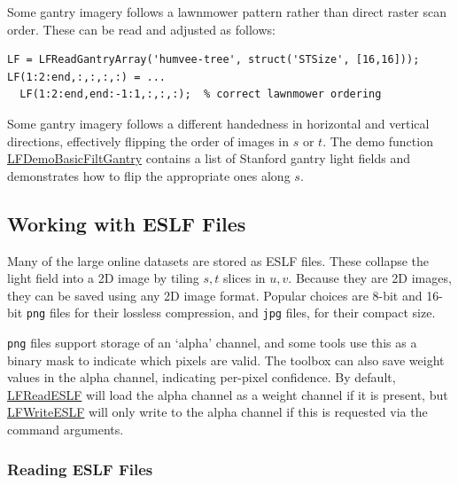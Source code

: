 \documentclass[onecolumn]{article}
\newcommand{\CiteFunc}[1]{\hyperlink{#1}{\small #1}}
\newcommand{\SymbolText}[1]{\texttt{\small #1}}
\begin{document}
Some gantry imagery follows a lawnmower pattern rather than direct raster scan order.  These can be read and adjusted as follows:
\begin{Verbatim}
LF = LFReadGantryArray('humvee-tree', struct('STSize', [16,16]));
LF(1:2:end,:,:,:,:) = ...
  LF(1:2:end,end:-1:1,:,:,:);  % correct lawnmower ordering
\end{Verbatim}

Some gantry imagery follows a different handedness in horizontal and vertical directions, effectively flipping the order of images in $s$ or $t$.  The demo function \CiteFunc{LFDemoBasicFiltGantry} contains a list of Stanford gantry light fields and demonstrates how to flip the appropriate ones along $s$.

\subsection{Working with ESLF Files}
\label{sect_ESLFTour}

Many of the large online datasets are stored as ESLF files. These collapse the light field into a 2D image by tiling $s,t$ slices in $u,v$. Because they are 2D images, they can be saved using any 2D image format. Popular choices are 8-bit and 16-bit \SymbolText{png} files for their lossless compression, and \SymbolText{jpg} files, for their compact size.  

\SymbolText{png} files support storage of an `alpha' channel, and some tools use this as a binary mask to indicate which pixels are valid. The toolbox can also save weight values in the alpha channel, indicating per-pixel confidence. By default, \CiteFunc{LFReadESLF} will load the alpha channel as a weight channel if it is present, but \CiteFunc{LFWriteESLF} will only write to the alpha channel if this is requested via the command arguments.

\subsubsection{Reading ESLF Files}
\end{document}
